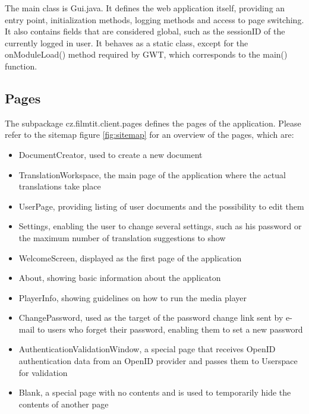 The main class is Gui.java. It defines the web application itself, providing an entry point, initialization methods, logging methods and access to page switching. It also contains fields that are considered global, such as the sessionID of the currently logged in user.
It behaves as a static class, except for the onModuleLoad() method required by GWT, which corresponds to the main() function.

\subsection{Pages}

The subpackage cz.filmtit.client.pages defines the pages of the application.
Please refer to the sitemap figure \ref{fig:sitemap} for an overview of the pages, which are:

\begin{itemize}
\item DocumentCreator, used to create a new document
\item TranslationWorkspace, the main page of the application where the actual translations take place
\item UserPage, providing listing of user documents and the possibility to edit them
\item Settings, enabling the user to change several settings, such as his password or the maximum number of translation suggestions to show
\item WelcomeScreen, displayed as the first page of the application
\item About, showing basic information about the applicaton
\item PlayerInfo, showing guidelines on how to run the media player
\item ChangePassword, used as the target of the password change link sent by e-mail to users who forget their password, enabling them to set a new password
\item AuthenticationValidationWindow, a special page that receives OpenID authentication data from an OpenID provider and passes them to Userspace for validation
\item Blank, a special page with no contents and is used to temporarily hide the contents of another page
\end{itemize}

